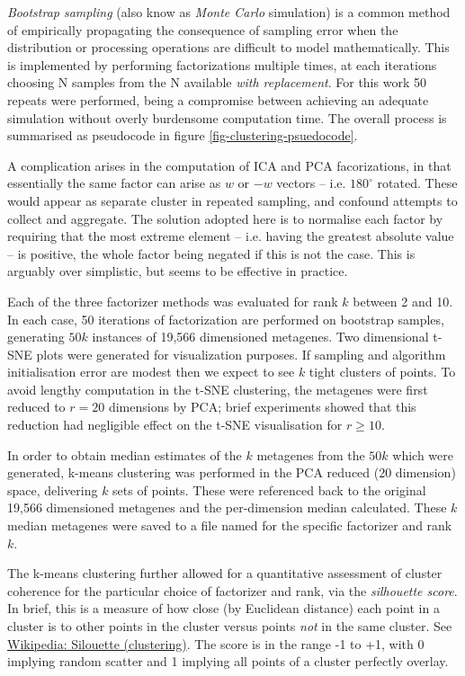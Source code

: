 \documentclass[draft, tikz, 12pt,a4paper,oneside,fleqn]{article}
\begin{document}
\emph{Bootstrap sampling} (also know as \emph{Monte Carlo} simulation) is a common method of empirically propagating the consequence of sampling error when the distribution or processing operations are difficult to model mathematically.   This is implemented by performing factorizations multiple times, at each iterations choosing N samples from the N available \emph{with replacement}.   For this work 50 repeats were performed, being a compromise between achieving an adequate simulation without overly burdensome computation time.  The overall process is summarised as pseudocode in figure \ref{fig-clustering-psuedocode}.  

A complication arises in the computation of ICA and PCA facorizations, in that essentially the same factor can arise as $w$ or $-w$ vectors -- i.e. $180^\circ$ rotated. These would appear as separate cluster in repeated sampling, and confound attempts to collect and aggregate.  The solution adopted here is to normalise each factor by requiring that the most extreme element -- i.e. having the greatest absolute value -- is positive, the whole factor being negated if this is not the case.  This is arguably over simplistic, but seems to be effective in practice.

Each of the three factorizer methods was evaluated for rank $k$ between 2 and 10.  In each case, 50 iterations of factorization are performed on bootstrap samples, generating $50 k$ instances of 19,566 dimensioned metagenes.  Two dimensional t-SNE plots were generated for visualization purposes.   If sampling and algorithm initialisation error are modest then we expect to see $k$ tight clusters of points.   To avoid lengthy computation in the t-SNE clustering, the metagenes were first reduced to $r=20$ dimensions by PCA; brief experiments showed that this reduction had negligible effect on the t-SNE visualisation for $r \geq 10$.   

In order to obtain median estimates of the $k$ metagenes from the $50 k$ which were generated, k-means clustering was performed in the PCA reduced (20 dimension) space, delivering $k$ sets of points.  These were referenced back to the original 19,566 dimensioned metagenes and the per-dimension median calculated.  These $k$ median metagenes were saved to a file named for the specific factorizer and rank $k$.  

The k-means clustering further allowed for a quantitative assessment of cluster coherence for the particular choice of factorizer and rank, via the \emph{silhouette score}.  In brief, this is a measure of how close (by Euclidean distance) each point in a cluster is to other points in the cluster versus points \emph{not} in the same cluster.  See 
\href{https://en.wikipedia.org/wiki/Silhouette_(clustering)}{Wikipedia: Silouette (clustering)}.
The score is in the range -1 to +1, with 0 implying random scatter and 1 implying all points of a cluster perfectly overlay.
\end{document}
